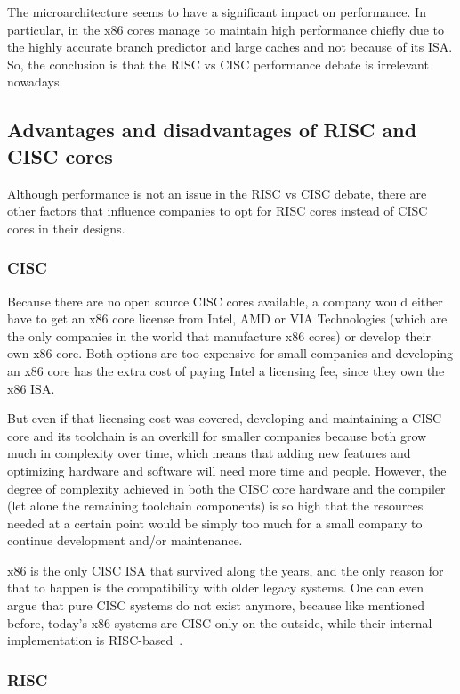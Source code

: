 The microarchitecture seems to have a significant impact on performance. In
particular, in the x86 cores manage to maintain high performance chiefly due to
the highly accurate branch predictor and large caches and not because of its
ISA. So, the conclusion is that the RISC vs CISC performance debate is
irrelevant nowadays.

\subsection{Advantages and disadvantages of RISC and CISC cores}
\label{subsections:riscciscadvantages}

Although performance is not an issue in the RISC vs CISC debate, there are other
factors that influence companies to opt for RISC cores instead of CISC cores in
their designs.

\subsubsection{CISC}

Because there are no open source CISC cores available, a company would either
have to get an x86 core license from Intel, AMD or VIA Technologies (which are
the only companies in the world that manufacture x86 cores) or develop their own
x86 core. Both options are too expensive for small companies and developing an
x86 core has the extra cost of paying Intel a licensing fee, since they own the
x86 ISA.

But even if that licensing cost was covered, developing and maintaining a CISC
core and its toolchain is an overkill for smaller companies because both grow
much in complexity over time, which means that adding new features and
optimizing hardware and software will need more time and people. However, the
degree of complexity achieved in both the CISC core hardware and the compiler
(let alone the remaining toolchain components) is so high that the resources
needed at a certain point would be simply too much for a small company to
continue development and/or maintenance.

x86 is the only CISC ISA that survived along the years, and the only reason for
that to happen is the compatibility with older legacy systems. One can even
argue that pure CISC systems do not exist anymore, because like mentioned
before, today's x86 systems are CISC only on the outside, while their internal
implementation is RISC-based~\cite{bib:crisc}.

\subsubsection{RISC}

